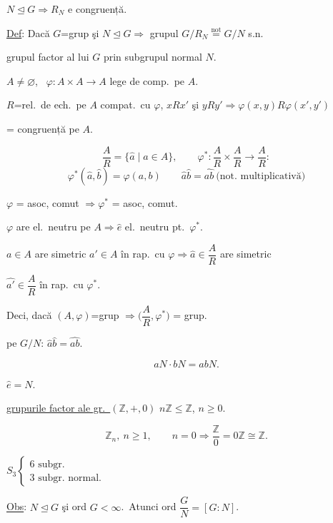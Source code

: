 \bigskip
\noindent $N\trianglelefteq G \Rightarrow R_N$ e congruență.

\bigskip
\noindent\underline{Def}: Dacă $G$=grup şi $N\trianglelefteq G \Rightarrow$ grupul $G/R_N \overset{\text{not}}{=} G/N$ s.n.

\noindent grupul factor al lui $G$ prin subgrupul normal $N$.

\bigskip
\noindent $A\neq\varnothing$, \ $\varphi: A\times A\to A$ lege de comp.\ pe $A$.

\noindent $R$=rel.\ de ech.\ pe $A$ compat.\ cu $\varphi$, \quad $xRx'$ şi $yRy' \Rightarrow \varphi(x,y)R\varphi(x',y')$

\noindent = congruență pe $A$.

\[
\frac{A}{R} = \{\hat a \mid a\in A\}, \qquad \varphi^*: \frac{A}{R}\times\frac{A}{R} \to \frac{A}{R}:
\]
\[
\varphi^*(\hat a,\hat b) = \varphi(a,b) \qquad \hat a\hat b=\widehat{ab} \ \text{(not.\ multiplicativă)}
\]

\bigskip
\noindent $\varphi$ = asoc, comut $\Rightarrow \varphi^*$ = asoc, comut.

\noindent $\varphi$ are el.\ neutru pe $A \Rightarrow \hat e$ el.\ neutru pt.\ $\varphi^*$.

\noindent $a\in A$ are simetric $a'\in A$ în rap.\ cu $\varphi \Rightarrow \hat a\in \dfrac{A}{R}$ are simetric

\noindent $\hat{a'}\in \dfrac{A}{R}$ în rap.\ cu $\varphi^*$.

\bigskip
\noindent Deci, dacă $(A,\varphi)$=grup $\Rightarrow \Big(\dfrac{A}{R},\varphi^*\Big)$ = grup.

\bigskip
\noindent pe $G/N$: \quad $\hat a\hat b = \widehat{ab}$.

\[
aN\cdot bN = abN.
\]

\noindent $\hat e = N$.

\bigskip
\noindent\underline{grupurile factor ale gr.\ $(\mathbb{Z},+,0)$} \quad $n\mathbb{Z}\leq \mathbb{Z}$, $n\geq 0$.

\[
\mathbb{Z}_n, \ n\geq 1, \qquad n=0 \Rightarrow \frac{\mathbb{Z}}{0} = 0\mathbb{Z} \cong \mathbb{Z}.
\]

\noindent $S_3 \begin{cases} 6 \text{ subgr.} \\ 3 \text{ subgr.\ normal.} \end{cases}$

\bigskip
\noindent\underline{Obs}: $N\trianglelefteq G$ şi ord $G<\infty$.\ Atunci ord $\dfrac{G}{N} = [G:N]$.

